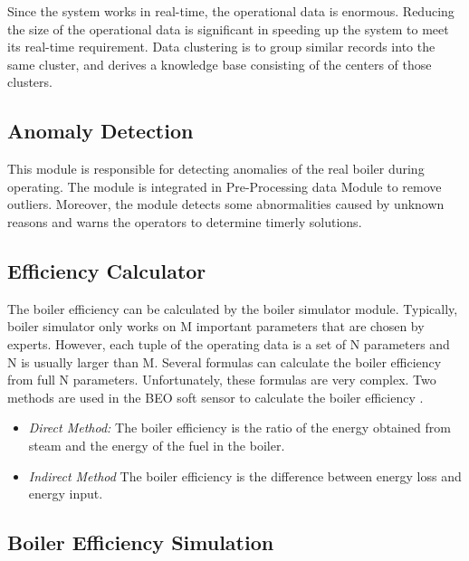 Since the system works in real-time, the operational data is enormous. Reducing the size of the operational data is significant in speeding up the system to meet its real-time requirement. Data clustering is to group similar records into the same cluster, and derives a knowledge base consisting of the centers of those clusters. 

\subsection{Anomaly Detection}

This module is responsible for detecting anomalies of the real boiler during operating. The module is integrated in Pre-Processing data Module to remove outliers. Moreover, the module detects some abnormalities caused by unknown reasons and warns the operators to determine timerly solutions.  

\subsection{Efficiency Calculator}

The boiler efficiency can be calculated by the boiler simulator module. Typically, boiler simulator only works on M important parameters that are chosen by experts. However, each tuple of the operating data is a set of N parameters and N is usually larger than M. Several formulas can calculate the boiler efficiency from full N parameters. Unfortunately, these formulas are very complex. Two methods are used in the BEO soft sensor to calculate the boiler efficiency \cite{boi:ref_11}.

\begin{itemize}

\item \textit{Direct Method:} The boiler efficiency is the ratio of the energy obtained from steam and the energy of the fuel in the boiler.
\item \textit{Indirect Method} The boiler efficiency is the difference between energy loss and energy input.

\end{itemize}

\subsection{Boiler Efficiency Simulation}

